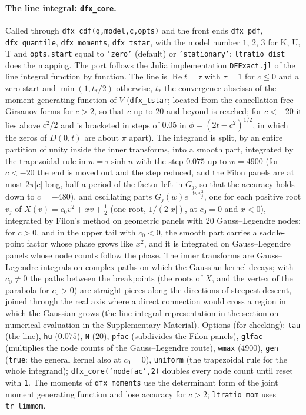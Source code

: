 \documentclass[11pt]{article}
\newcommand{\code}[1]{\texttt{#1}}
\newcommand{\iu}{{\mathrm i}}
\newcommand{\Rea}{\operatorname{Re}}
\begin{document}
\paragraph{The line integral: \code{dfx\_core}.}  Called through \code{dfx\_cdf(q,model,c,opts)} and the front ends \code{dfx\_pdf}, \code{dfx\_quantile}, \code{dfx\_moments}, \code{dfx\_tstar}, with the model number $1$, $2$, $3$ for \textsf{K}, \textsf{U}, \textsf{T} and \code{opts.start} equal to \code{'zero'} (default) or \code{'stationary'}; \code{ltratio\_dist} does the mapping.  The port follows the Julia implementation \code{DFExact.jl} of the line integral function by function.  The line is $\Rea t=\tau$ with $\tau=1$ for $c\le0$ and a zero start and $\min(1,t_*/2)$ otherwise, $t_*$ the convergence abscissa of the moment generating function of $V$ (\code{dfx\_tstar}; located from the cancellation-free Girsanov forms for $c>2$, so that $c$ up to $20$ and beyond is reached; for $c<-20$ it lies above $c^2/2$ and is bracketed in steps of $0.05$ in $\phi=(2t-c^2)^{1/2}$, in which the zeros of $D(0,t)$ are about $\pi$ apart).  The integrand is split, by an entire partition of unity inside the inner transforms, into a smooth part, integrated by the trapezoidal rule in $w=\tau\sinh u$ with the step $0.075$ up to $w=4900$ (for $c<-20$ the end is moved out and the step reduced, and the Filon panels are at most $2\pi|c|$ long, half a period of the factor left in $G_j$, so that the accuracy holds down to $c=-480$), and oscillating parts $G_j(w)e^{-\iu wv_j^2}$, one for each positive root $v_j$ of $X(v)=c_0v^2+xv+\frac12$ (one root, $1/(2|x|)$, at $c_0=0$ and $x<0$), integrated by Filon's method on geometric panels with $20$ Gauss--Legendre nodes; for $c>0$, and in the upper tail with $c_0<0$, the smooth part carries a saddle-point factor whose phase grows like $x^2$, and it is integrated on Gauss--Legendre panels whose node counts follow the phase.  The inner transforms are Gauss--Legendre integrals on complex paths on which the Gaussian kernel decays; with $c_0\ne0$ the paths between the breakpoints (the roots of $X$, and the vertex of the parabola for $c_0>0$) are straight pieces along the directions of steepest descent, joined through the real axis where a direct connection would cross a region in which the Gaussian grows (the line integral representation in the section on numerical evaluation in the Supplementary Material).  Options (for checking): \code{tau} (the line), \code{hu} ($0.075$), \code{N} ($20$), \code{pfac} (subdivides the Filon panels), \code{glfac} (multiplies the node counts of the Gauss--Legendre route), \code{wmax} ($4900$), \code{gen} (\code{true}: the general kernel also at $c_0=0$), \code{uniform} (the trapezoidal rule for the whole integrand); \code{dfx\_core('nodefac',2)} doubles every node count until reset with \code{1}.  The moments of \code{dfx\_moments} use the determinant form of the joint moment generating function and lose accuracy for $c>2$; \code{ltratio\_mom} uses \code{tr\_limmom}.
\end{document}
